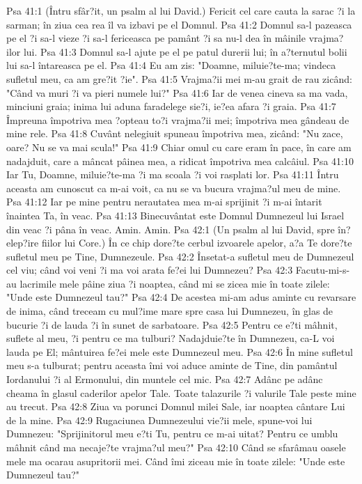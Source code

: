Psa 41:1  (Întru sfâr?it, un psalm al lui David.) Fericit cel care cauta la sarac ?i la sarman; în ziua cea rea îl va izbavi pe el Domnul.
Psa 41:2  Domnul sa-l pazeasca pe el ?i sa-l vieze ?i sa-l fericeasca pe pamânt ?i sa nu-l dea în mâinile vrajma?ilor lui.
Psa 41:3  Domnul sa-l ajute pe el pe patul durerii lui; în a?ternutul bolii lui sa-l întareasca pe el.
Psa 41:4  Eu am zis: "Doamne, miluie?te-ma; vindeca sufletul meu, ca am gre?it ?ie".
Psa 41:5  Vrajma?ii mei m-au grait de rau zicând: "Când va muri ?i va pieri numele lui?"
Psa 41:6  Iar de venea cineva sa ma vada, minciuni graia; inima lui aduna faradelege sie?i, ie?ea afara ?i graia.
Psa 41:7  Împreuna împotriva mea ?opteau to?i vrajma?ii mei; împotriva mea gândeau de mine rele.
Psa 41:8  Cuvânt nelegiuit spuneau împotriva mea, zicând: "Nu zace, oare? Nu se va mai scula!"
Psa 41:9  Chiar omul cu care eram în pace, în care am nadajduit, care a mâncat pâinea mea, a ridicat împotriva mea calcâiul.
Psa 41:10  Iar Tu, Doamne, miluie?te-ma ?i ma scoala ?i voi rasplati lor.
Psa 41:11  Întru aceasta am cunoscut ca m-ai voit, ca nu se va bucura vrajma?ul meu de mine.
Psa 41:12  Iar pe mine pentru nerautatea mea m-ai sprijinit ?i m-ai întarit înaintea Ta, în veac.
Psa 41:13  Binecuvântat este Domnul Dumnezeul lui Israel din veac ?i pâna în veac. Amin. Amin.
Psa 42:1  (Un psalm al lui David, spre în?elep?ire fiilor lui Core.) În ce chip dore?te cerbul izvoarele apelor, a?a Te dore?te sufletul meu pe Tine, Dumnezeule.
Psa 42:2  Însetat-a sufletul meu de Dumnezeul cel viu; când voi veni ?i ma voi arata fe?ei lui Dumnezeu?
Psa 42:3  Facutu-mi-s-au lacrimile mele pâine ziua ?i noaptea, când mi se zicea mie în toate zilele: "Unde este Dumnezeul tau?"
Psa 42:4  De acestea mi-am adus aminte cu revarsare de inima, când treceam cu mul?ime mare spre casa lui Dumnezeu, în glas de bucurie ?i de lauda ?i în sunet de sarbatoare.
Psa 42:5  Pentru ce e?ti mâhnit, suflete al meu, ?i pentru ce ma tulburi? Nadajduie?te în Dumnezeu, ca-L voi lauda pe El; mântuirea fe?ei mele este Dumnezeul meu.
Psa 42:6  În mine sufletul meu s-a tulburat; pentru aceasta îmi voi aduce aminte de Tine, din pamântul Iordanului ?i al Ermonului, din muntele cel mic.
Psa 42:7  Adânc pe adânc cheama în glasul caderilor apelor Tale. Toate talazurile ?i valurile Tale peste mine au trecut.
Psa 42:8  Ziua va porunci Domnul milei Sale, iar noaptea cântare Lui de la mine.
Psa 42:9  Rugaciunea Dumnezeului vie?ii mele, spune-voi lui Dumnezeu: "Sprijinitorul meu e?ti Tu, pentru ce m-ai uitat? Pentru ce umblu mâhnit când ma necaje?te vrajma?ul meu?"
Psa 42:10  Când se sfarâmau oasele mele ma ocarau asupritorii mei. Când îmi ziceau mie în toate zilele: "Unde este Dumnezeul tau?"
